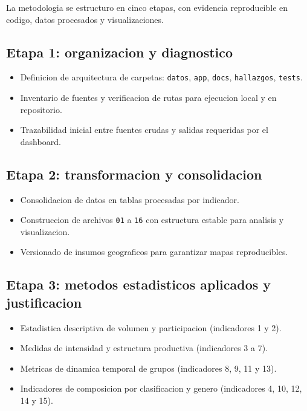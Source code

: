 \documentclass[12pt,letterpaper]{article}
\begin{document}
La metodologia se estructuro en cinco etapas, con evidencia reproducible en codigo, datos procesados y visualizaciones.

\subsection{Etapa 1: organizacion y diagnostico}

\begin{itemize}
  \item Definicion de arquitectura de carpetas: \texttt{datos}, \texttt{app}, \texttt{docs}, \texttt{hallazgos}, \texttt{tests}.
  \item Inventario de fuentes y verificacion de rutas para ejecucion local y en repositorio.
  \item Trazabilidad inicial entre fuentes crudas y salidas requeridas por el dashboard.
\end{itemize}

\subsection{Etapa 2: transformacion y consolidacion}

\begin{itemize}
  \item Consolidacion de datos en tablas procesadas por indicador.
  \item Construccion de archivos \texttt{01} a \texttt{16} con estructura estable para analisis y visualizacion.
  \item Versionado de insumos geograficos para garantizar mapas reproducibles.
\end{itemize}

\subsection{Etapa 3: metodos estadisticos aplicados y justificacion}

\begin{itemize}
  \item Estadistica descriptiva de volumen y participacion (indicadores 1 y 2).
  \item Medidas de intensidad y estructura productiva (indicadores 3 a 7).
  \item Metricas de dinamica temporal de grupos (indicadores 8, 9, 11 y 13).
  \item Indicadores de composicion por clasificacion y genero (indicadores 4, 10, 12, 14 y 15).
\end{itemize}
\end{document}
